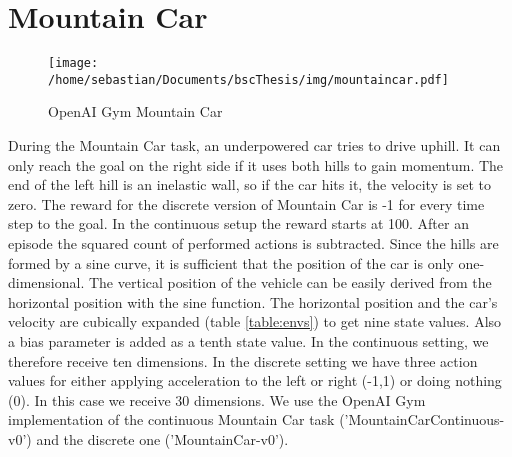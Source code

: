 \section{Mountain Car}

\begin{wrapfigure}{R}{0.3\textwidth}
    \centering
    \texttt{[image: /home/sebastian/Documents/bscThesis/img/mountaincar.pdf]}
    \caption*{OpenAI Gym Mountain Car\label{fig:mountaincarPygym}}
\end{wrapfigure}

During the Mountain Car task, an underpowered car tries to drive uphill. It can only reach the goal on the right side if it uses both hills to gain momentum. The end of the left hill is an inelastic wall, so if the car hits it, the velocity is set to zero. The reward for the discrete version of Mountain Car is -1 for every time step to the goal. In the continuous setup the reward starts at 100. After an episode the squared count of performed actions is subtracted. Since the hills are formed by a sine curve, it is sufficient that the position of the car is only one-dimensional. The vertical position of the vehicle can be easily derived from the horizontal position with the sine function. The horizontal position and the car's velocity are cubically expanded (table \ref{table:envs}) to get nine state values. Also a bias parameter is added as a tenth state value. In the continuous setting, we therefore receive ten dimensions. In the discrete setting we have three action values for either applying acceleration to the left or right (-1,1) or doing nothing (0). In this case we receive 30 dimensions. We use the OpenAI Gym implementation of the continuous Mountain Car task ('MountainCarContinuous-v0') and the discrete one ('MountainCar-v0').

%



%
%

